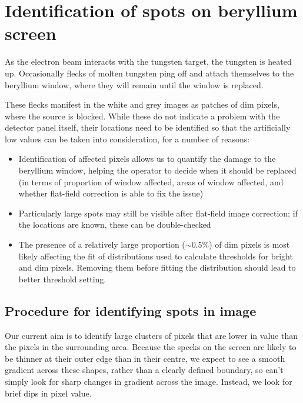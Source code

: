 \documentclass[10pt,fleqn]{article}
\begin{document}
\section*{Identification of spots on beryllium screen}

As the electron beam interacts with the tungsten target, the tungsten is heated up. Occasionally flecks of molten tungsten ping off and attach themselves to the beryllium window, where they will remain until the window is replaced.

These flecks manifest in the white and grey images as patches of dim pixels, where the source is blocked. While these do not indicate a problem with the detector panel itself, their locations need to be identified so that the artificially low values can be taken into consideration, for a number of reasons:
\begin{itemize}
\item Identification of affected pixels allows us to quantify the damage to the beryllium window, helping the operator to decide when it should be replaced (in terms of proportion of window affected, areas of window affected, and whether flat-field correction is able to fix the issue)

\item Particularly large spots may still be visible after flat-field image correction; if the locations are known, these can be double-checked

\item The presence of a relatively large proportion ($\sim 0.5\%$) of dim pixels is most likely affecting the fit of distributions used to calculate thresholds for bright and dim pixels. Removing them before fitting the distribution should lead to better threshold setting. 
\end{itemize}



\subsection*{Procedure for identifying spots in image}
Our current aim is to identify large clusters of pixels that are lower in value than the pixels in the surrounding area. Because the specks on the screen are likely to be thinner at their outer edge than in their centre, we expect to see a smooth gradient across these shapes, rather than a clearly defined boundary, so can't simply look for sharp changes in gradient across the image. Instead, we look for brief dips in pixel value.
\end{document}
